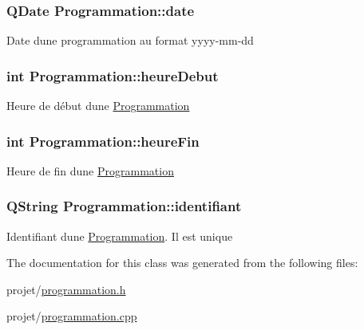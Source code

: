 \subsubsection[{date}]{\setlength{\rightskip}{0pt plus 5cm}Q\+Date Programmation\+::date\hspace{0.3cm}{\ttfamily [protected]}}\label{class_programmation_a993696842e7ec41f37aa9c0e7e383296}
Date d\textquotesingle{}une programmation au format yyyy-\/mm-\/dd \hypertarget{class_programmation_a1456089cb1f36c1f93e8e001a3181add}{}
\subsubsection[{heure\+Debut}]{\setlength{\rightskip}{0pt plus 5cm}int Programmation\+::heure\+Debut\hspace{0.3cm}{\ttfamily [protected]}}\label{class_programmation_a1456089cb1f36c1f93e8e001a3181add}
Heure de début d\textquotesingle{}une \hyperlink{class_programmation}{Programmation} \hypertarget{class_programmation_a6a807cdfb835c2440834ea04e1ef9d40}{}
\subsubsection[{heure\+Fin}]{\setlength{\rightskip}{0pt plus 5cm}int Programmation\+::heure\+Fin\hspace{0.3cm}{\ttfamily [protected]}}\label{class_programmation_a6a807cdfb835c2440834ea04e1ef9d40}
Heure de fin d\textquotesingle{}une \hyperlink{class_programmation}{Programmation} \hypertarget{class_programmation_aea36cbc16a71cead5fed20ce8b7670fc}{}
\subsubsection[{identifiant}]{\setlength{\rightskip}{0pt plus 5cm}Q\+String Programmation\+::identifiant\hspace{0.3cm}{\ttfamily [protected]}}\label{class_programmation_aea36cbc16a71cead5fed20ce8b7670fc}
Identifiant d\textquotesingle{}une \hyperlink{class_programmation}{Programmation}. Il est unique 

The documentation for this class was generated from the following files\+:\begin{DoxyCompactItemize}
\item 
projet/\hyperlink{programmation_8h}{programmation.\+h}\item 
projet/\hyperlink{programmation_8cpp}{programmation.\+cpp}\end{DoxyCompactItemize}
